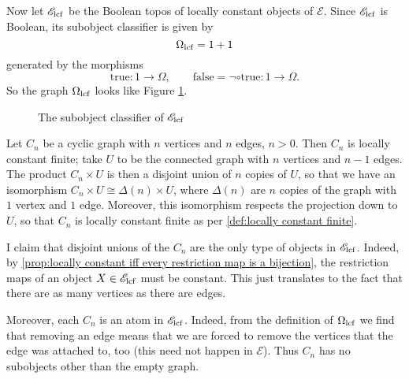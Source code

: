 Now let $\mathscr{E}_{\operatorname{lcf}}$ be the Boolean topos of locally constant objects of $\mathscr{E}$. Since $\mathscr{E}_{\operatorname{lcf}}$ is Boolean, its subobject classifier is given by
\[ \Omega_{\operatorname{lcf}} = 1 + 1 \]
generated by the morphisms
\[ \text{true} : 1 \to \Omega, \qquad \text{false} = \neg \circ \text{true} : 1 \to \Omega. \]
So the graph $\Omega_{\operatorname{lcf}}$ looks like Figure \ref{fig:subobject classifier for lcf graph topos}.

\begin{figure}
\centering
{}
\caption{The subobject classifier of $\mathscr{E}_{\operatorname{lcf}}$}
\label{fig:subobject classifier for lcf graph topos}
\end{figure}

Let $C_n$ be a cyclic graph with $n$ vertices and $n$ edges, $n > 0$. Then $C_n$ is locally constant finite; take $U$ to be the connected graph with $n$ vertices and $n-1$ edges. The product $C_n \times U$ is then a disjoint union of $n$ copies of $U$, so that we have an isomorphism $C_n \times U \cong \Delta(n) \times U$, where $\Delta(n)$ are $n$ copies of the graph with $1$ vertex and $1$ edge. Moreover, this isomorphism respects the projection down to $U$, so that $C_n$ is locally constant finite as per \cref{def:locally constant finite}.

I claim that disjoint unions of the $C_n$ are the only type of objects in $\mathscr{E}_{\operatorname{lcf}}$. Indeed, by \cref{prop:locally constant iff every restriction map is a bijection}, the restriction maps of an object $X \in \mathscr{E}_{\operatorname{lcf}}$ must be constant. This just translates to the fact that there are as many vertices as there are edges.

Moreover, each $C_n$ is an atom in $\mathscr{E}_{\operatorname{lcf}}$. Indeed, from the definition of $\Omega_{\operatorname{lcf}}$ we find that removing an edge means that we are forced to remove the vertices that the edge was attached to, too (this need not happen in $\mathscr{E}$). Thus $C_n$ has no subobjects other than the empty graph.

